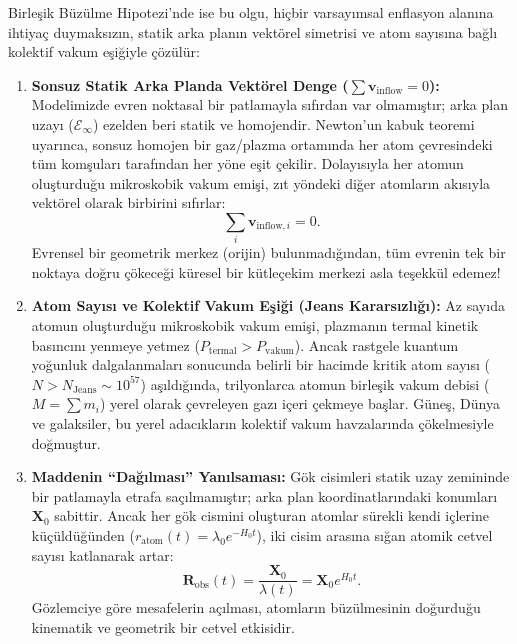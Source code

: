 Birleşik Büzülme Hipotezi'nde ise bu olgu, hiçbir varsayımsal enflasyon alanına ihtiyaç duymaksızın, statik arka planın vektörel simetrisi ve atom sayısına bağlı kolektif vakum eşiğiyle çözülür:

\begin{enumerate}
    \item \textbf{Sonsuz Statik Arka Planda Vektörel Denge ($\sum \mathbf{v}_{\mathrm{inflow}} = 0$):}
          Modelimizde evren noktasal bir patlamayla sıfırdan var olmamıştır; arka plan uzayı ($\mathcal{E}_\infty$) ezelden beri statik ve homojendir. Newton'un kabuk teoremi uyarınca, sonsuz homojen bir gaz/plazma ortamında her atom çevresindeki tüm komşuları tarafından her yöne eşit çekilir. Dolayısıyla her atomun oluşturduğu mikroskobik vakum emişi, zıt yöndeki diğer atomların akısıyla vektörel olarak birbirini sıfırlar:
          \begin{equation}
              \sum_{i} \mathbf{v}_{\mathrm{inflow}, i} = 0.
              \label{eq:vektorel_denge}
          \end{equation}
          Evrensel bir geometrik merkez (orijin) bulunmadığından, tüm evrenin tek bir noktaya doğru çökeceği küresel bir kütleçekim merkezi asla teşekkül edemez!

    \item \textbf{Atom Sayısı ve Kolektif Vakum Eşiği (Jeans Kararsızlığı):}
          Az sayıda atomun oluşturduğu mikroskobik vakum emişi, plazmanın termal kinetik basıncını yenmeye yetmez ($P_{\mathrm{termal}} > P_{\mathrm{vakum}}$). Ancak rastgele kuantum yoğunluk dalgalanmaları sonucunda belirli bir hacimde kritik atom sayısı ($N > N_{\mathrm{Jeans}} \sim 10^{57}$) aşıldığında, trilyonlarca atomun birleşik vakum debisi ($M = \sum m_i$) yerel olarak çevreleyen gazı içeri çekmeye başlar. Güneş, Dünya ve galaksiler, bu yerel adacıkların kolektif vakum havzalarında çökelmesiyle doğmuştur.

    \item \textbf{Maddenin ``Dağılması'' Yanılsaması:}
          Gök cisimleri statik uzay zemininde bir patlamayla etrafa saçılmamıştır; arka plan koordinatlarındaki konumları $\mathbf{X}_0$ sabittir. Ancak her gök cismini oluşturan atomlar sürekli kendi içlerine küçüldüğünden ($r_{\mathrm{atom}}(t) = \lambda_0 e^{-H_0 t}$), iki cisim arasına sığan atomik cetvel sayısı katlanarak artar:
          \begin{equation}
              \mathbf{R}_{\mathrm{obs}}(t) = \frac{\mathbf{X}_0}{\lambda(t)} = \mathbf{X}_0 e^{H_0 t}.
          \end{equation}
          Gözlemciye göre mesafelerin açılması, atomların büzülmesinin doğurduğu kinematik ve geometrik bir cetvel etkisidir.
\end{enumerate}

